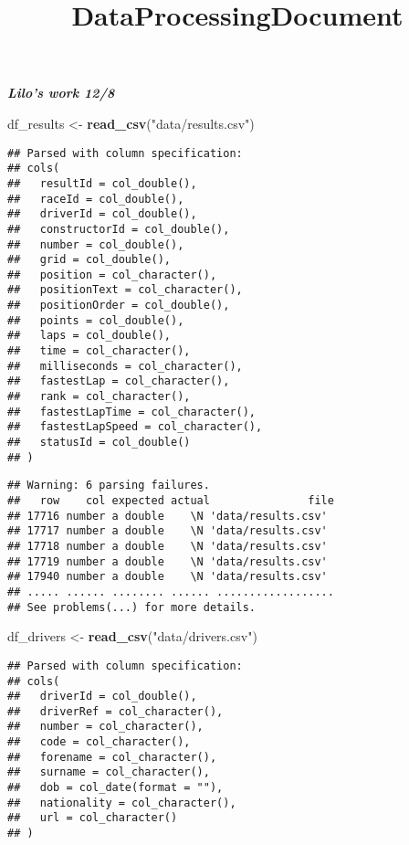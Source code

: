 \documentclass[
]{article}
\title{DataProcessingDocument}
\author{}
\date{\vspace{-2.5em}}
\newenvironment{Shaded}{\begin{snugshade}}{\end{snugshade}}
\newcommand{\KeywordTok}[1]{\textcolor[rgb]{0.13,0.29,0.53}{\textbf{#1}}}
\newcommand{\NormalTok}[1]{#1}
\newcommand{\StringTok}[1]{\textcolor[rgb]{0.31,0.60,0.02}{#1}}
\begin{document}
\maketitle

{
\setcounter{tocdepth}{2}
\tableofcontents
}
\textbf{\emph{Lilo's work 12/8}}

\begin{Shaded}
\begin{Highlighting}[]
\NormalTok{df_results <-}\StringTok{  }\KeywordTok{read_csv}\NormalTok{(}\StringTok{"data/results.csv"}\NormalTok{)}
\end{Highlighting}
\end{Shaded}

\begin{verbatim}
## Parsed with column specification:
## cols(
##   resultId = col_double(),
##   raceId = col_double(),
##   driverId = col_double(),
##   constructorId = col_double(),
##   number = col_double(),
##   grid = col_double(),
##   position = col_character(),
##   positionText = col_character(),
##   positionOrder = col_double(),
##   points = col_double(),
##   laps = col_double(),
##   time = col_character(),
##   milliseconds = col_character(),
##   fastestLap = col_character(),
##   rank = col_character(),
##   fastestLapTime = col_character(),
##   fastestLapSpeed = col_character(),
##   statusId = col_double()
## )
\end{verbatim}

\begin{verbatim}
## Warning: 6 parsing failures.
##   row    col expected actual               file
## 17716 number a double    \N 'data/results.csv'
## 17717 number a double    \N 'data/results.csv'
## 17718 number a double    \N 'data/results.csv'
## 17719 number a double    \N 'data/results.csv'
## 17940 number a double    \N 'data/results.csv'
## ..... ...... ........ ...... ..................
## See problems(...) for more details.
\end{verbatim}

\begin{Shaded}
\begin{Highlighting}[]
\NormalTok{df_drivers <-}\StringTok{ }\KeywordTok{read_csv}\NormalTok{(}\StringTok{"data/drivers.csv"}\NormalTok{)}
\end{Highlighting}
\end{Shaded}

\begin{verbatim}
## Parsed with column specification:
## cols(
##   driverId = col_double(),
##   driverRef = col_character(),
##   number = col_character(),
##   code = col_character(),
##   forename = col_character(),
##   surname = col_character(),
##   dob = col_date(format = ""),
##   nationality = col_character(),
##   url = col_character()
## )
\end{verbatim}
\end{document}
